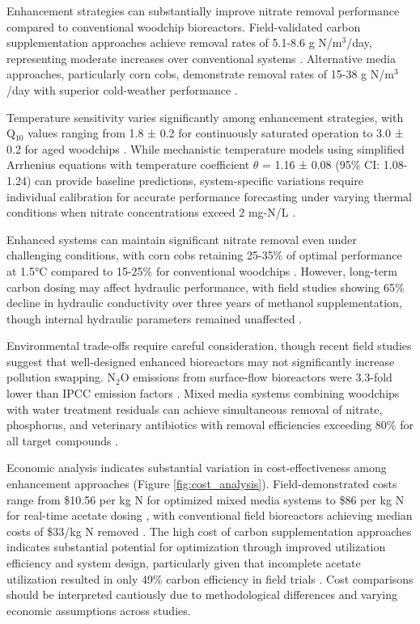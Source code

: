 \documentclass[12pt,a4paper]{article}
\begin{document}
Enhancement strategies can substantially improve nitrate removal performance compared to conventional woodchip bioreactors. Field-validated carbon supplementation approaches achieve removal rates of 5.1-8.6 g N/m$^3$/day, representing moderate increases over conventional systems \citep{RN632}. Alternative media approaches, particularly corn cobs, demonstrate removal rates of 15-38 g N/m$^3$/day with superior cold-weather performance \citep{RN350, RN624}.

Temperature sensitivity varies significantly among enhancement strategies, with Q$_{10}$ values ranging from 1.8 ± 0.2 for continuously saturated operation to 3.0 ± 0.2 for aged woodchips \citep{RN228}. While mechanistic temperature models using simplified Arrhenius equations with temperature coefficient $\theta$ = 1.16 ± 0.08 (95\% CI: 1.08-1.24) can provide baseline predictions, system-specific variations require individual calibration for accurate performance forecasting under varying thermal conditions when nitrate concentrations exceed 2 mg-N/L \citep{RN242}.

Enhanced systems can maintain significant nitrate removal even under challenging conditions, with corn cobs retaining 25-35\% of optimal performance at 1.5°C compared to 15-25\% for conventional woodchips \citep{RN350, RN624}. However, long-term carbon dosing may affect hydraulic performance, with field studies showing 65\% decline in hydraulic conductivity over three years of methanol supplementation, though internal hydraulic parameters remained unaffected \citep{RN632}.

Environmental trade-offs require careful consideration, though recent field studies suggest that well-designed enhanced bioreactors may not significantly increase pollution swapping. N$_{2}$O emissions from surface-flow bioreactors were 3.3-fold lower than IPCC emission factors \citep{RN1181}. Mixed media systems combining woodchips with water treatment residuals can achieve simultaneous removal of nitrate, phosphorus, and veterinary antibiotics with removal efficiencies exceeding 80\% for all target compounds \citep{RN370}.

Economic analysis indicates substantial variation in cost-effectiveness among enhancement approaches (Figure \ref{fig:cost_analysis}). Field-demonstrated costs range from \$10.56 per kg N for optimized mixed media systems \citep{RN350} to \$86 per kg N for real-time acetate dosing \citep{RN196}, with conventional field bioreactors achieving median costs of \$33/kg N removed \citep{RN289}. The high cost of carbon supplementation approaches indicates substantial potential for optimization through improved utilization efficiency and system design, particularly given that incomplete acetate utilization resulted in only 49\% carbon efficiency in field trials \citep{RN196}. Cost comparisons should be interpreted cautiously due to methodological differences and varying economic assumptions across studies.
\end{document}
